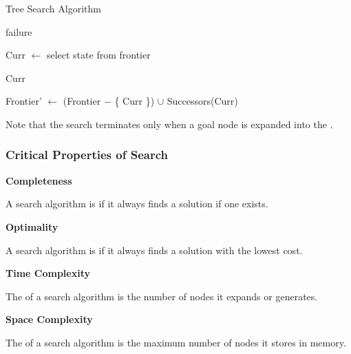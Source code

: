\begin{algorithm}
    \caption{Tree Search Algorithm}
    
    \begin{algorithmic}[1]
                \State \Return failure
            \EndIf

            \State Curr $\gets$ select state from frontier

                \State \Return Curr
            \EndIf

            \State Frontier' $\gets$ (Frontier $-$ \{ Curr \}) $\cup$ Successors(Curr)

            \State \Return {}
        \EndFunction
    \end{algorithmic}
\end{algorithm}


Note that the search terminates only when a goal node is expanded into the \Frontier.

\subsubsection{Critical Properties of Search}

\begin{listu}
    \item \textbf{Completeness}
    
    \begin{listu}
        \item A search algorithm is  if it always finds a solution if one exists.
    \end{listu}

    \item \textbf{Optimality}
    
    \begin{listu}
        \item A search algorithm is  if it always finds a solution with the lowest cost.
    \end{listu}

    \item \textbf{Time Complexity}
    
    \begin{listu}
        \item The  of a search algorithm is the number of nodes it expands or generates. 
    \end{listu}

    \item \textbf{Space Complexity}
    
    \begin{listu}
        \item The  of a search algorithm is the maximum number of nodes it stores in memory.
    \end{listu}
\end{listu}

